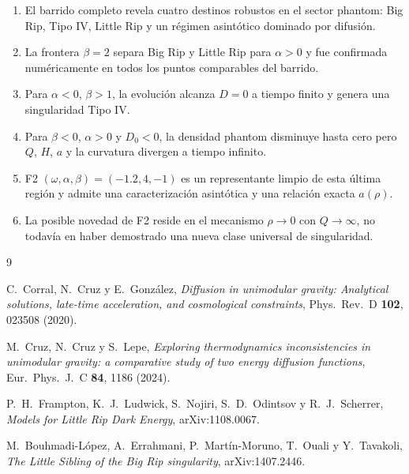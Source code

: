 \documentclass[11pt,a4paper]{article}
\begin{document}
\begin{enumerate}
    \item El barrido completo revela cuatro destinos robustos en el sector
    phantom: Big Rip, Tipo IV, Little Rip y un régimen asintótico dominado
    por difusión.
    \item La frontera $\beta=2$ separa Big Rip y Little Rip para
    $\alpha>0$ y fue confirmada numéricamente en todos los puntos
    comparables del barrido.
    \item Para $\alpha<0$, $\beta>1$, la evolución alcanza $D=0$ a tiempo
    finito y genera una singularidad Tipo IV.
    \item Para $\beta<0$, $\alpha>0$ y $D_0<0$, la densidad phantom
    disminuye hasta cero pero $Q$, $H$, $a$ y la curvatura divergen a
    tiempo infinito.
    \item F2 $(\omega,\alpha,\beta)=(-1.2,4,-1)$ es un representante limpio
    de esta última región y admite una caracterización asintótica y una
    relación exacta $a(\rho)$.
    \item La posible novedad de F2 reside en el mecanismo
    $\rho\to0$ con $Q\to\infty$, no todavía en haber demostrado una nueva
    clase universal de singularidad.
\end{enumerate}

\begin{thebibliography}{9}

C.~Corral, N.~Cruz y E.~González,
\emph{Diffusion in unimodular gravity: Analytical solutions, late-time
acceleration, and cosmological constraints},
Phys.\ Rev.\ D \textbf{102}, 023508 (2020).

M.~Cruz, N.~Cruz y S.~Lepe,
\emph{Exploring thermodynamics inconsistencies in unimodular gravity:
a comparative study of two energy diffusion functions},
Eur.\ Phys.\ J.\ C \textbf{84}, 1186 (2024).

P.~H.~Frampton, K.~J.~Ludwick, S.~Nojiri, S.~D.~Odintsov y R.~J.~Scherrer,
\emph{Models for Little Rip Dark Energy},
arXiv:1108.0067.

M.~Bouhmadi-López, A.~Errahmani, P.~Martín-Moruno, T.~Ouali y Y.~Tavakoli,
\emph{The Little Sibling of the Big Rip singularity},
arXiv:1407.2446.

\end{thebibliography}
\end{document}
